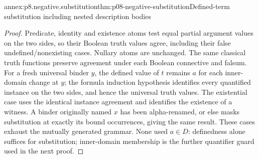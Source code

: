 \begin{annexitem}{annex:p8.negative.substitution}{thm:p08-negative-substitution}{Defined-term substitution including nested description bodies}
\begin{proof}
Predicate, identity and existence atoms test equal partial argument
values on the two sides, so their Boolean truth values agree, including
their false undefined/nonexisting cases.  Nullary atoms are unchanged.
The same classical truth functions preserve agreement under each
Boolean connective and falsum.  For a fresh universal binder \(y\),
the defined value of \(t\) remains \(a\) for each inner-domain change
at \(y\); the formula induction hypothesis identifies every quantified
instance on the two sides, and hence the universal truth values.
The existential case uses the identical instance agreement and
identifies the existence of a witness.  A binder originally named \(x\)
has been alpha-renamed, or else masks substitution at exactly its bound
occurrences, giving the same result.  These cases exhaust the mutually
generated grammar.  None used \(a\in D\): definedness alone suffices
for substitution; inner-domain membership is the further quantifier
guard used in the next proof.
\end{proof}
\end{annexitem}

